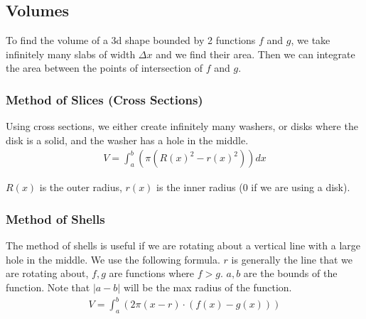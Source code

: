 \documentclass[12pt,letterpaper]{article} \usepackage{amsmath} \usepackage{graphicx}  \usepackage{longtable}  \usepackage{amssymb}
\begin{document}
        \subsection{Volumes}
        To find the volume of a 3d shape bounded by 2 functions $f$ and $g$, we take infinitely many slabs of width $\Delta x$ and we find their area. Then we can integrate the area between the points of intersection of $f$ and $g$.
            \subsubsection{Method of Slices (Cross Sections)}
            Using cross sections, we either create infinitely many washers, or disks where the disk is a solid, and the washer has a hole in the middle. 
            \begin{align*}
                V=\int^b_a \left(\pi \left(R(x)^2 -r(x)^2 \right)\right)dx
            \end{align*}

            $R(x)$ is the outer radius, $r(x)$ is the inner radius (0 if we are using a disk).

            \subsubsection{Method of Shells}
            The method of shells is useful if we are rotating about a vertical line with a large hole in the middle.
            We use the following formula. $r$ is generally the line that we are rotating about, $f, g$ are functions where $f>g$. $a, b$ are the bounds of the function. Note that $|a-b|$ will be the max radius of the function. 
            \begin{align*}
                V = \int^b_a \left(2\pi\left(x-r\right)\cdot (f(x)-g(x))\right)
            \end{align*}
\end{document}
